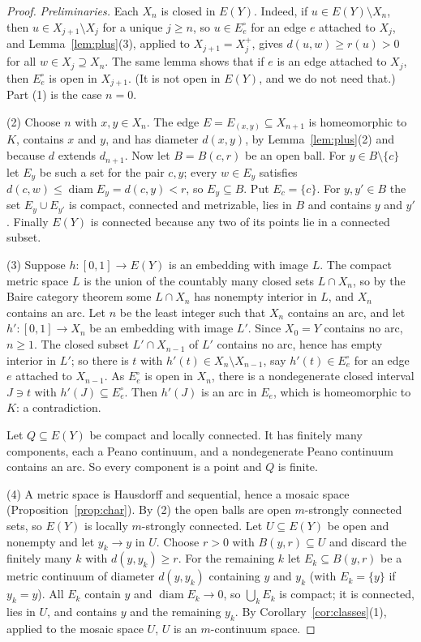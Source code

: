 \documentclass[11pt]{amsart}
\theoremstyle{definition}
\theoremstyle{remark}
\newcommand{\diam}{\operatorname{diam}}
\numberwithin{equation}{section}
\begin{document}
\begin{proof}
\emph{Preliminaries.} Each $X_n$ is closed in $E(Y)$. Indeed, if $u\in E(Y)\setminus X_n$, then $u\in X_{j+1}\setminus X_j$ for a unique $j\ge n$, so $u\in E_e^\circ$ for an edge $e$ attached to $X_j$, and Lemma~\ref{lem:plus}(3), applied to $X_{j+1}=X_j^+$, gives $d(u,w)\ge r(u)>0$ for all $w\in X_j\supseteq X_n$. The same lemma shows that if $e$ is an edge attached to $X_j$, then $E_e^\circ$ is open in $X_{j+1}$. (It is not open in $E(Y)$, and we do not need that.) Part (1) is the case $n=0$.

(2) Choose $n$ with $x,y\in X_n$. The edge $E=E_{(x,y)}\subseteq X_{n+1}$ is homeomorphic to $K$, contains $x$ and $y$, and has diameter $d(x,y)$, by Lemma~\ref{lem:plus}(2) and because $d$ extends $d_{n+1}$. Now let $B=B(c,r)$ be an open ball. For $y\in B\setminus\{c\}$ let $E_y$ be such a set for the pair $c,y$; every $w\in E_y$ satisfies $d(c,w)\le\diam E_y=d(c,y)<r$, so $E_y\subseteq B$. Put $E_c=\{c\}$. For $y,y'\in B$ the set $E_y\cup E_{y'}$ is compact, connected and metrizable, lies in $B$ and contains $y$ and $y'$. Finally $E(Y)$ is connected because any two of its points lie in a connected subset.

(3) Suppose $h\colon[0,1]\to E(Y)$ is an embedding with image $L$. The compact metric space $L$ is the union of the countably many closed sets $L\cap X_n$, so by the Baire category theorem some $L\cap X_n$ has nonempty interior in $L$, and $X_n$ contains an arc. Let $n$ be the least integer such that $X_n$ contains an arc, and let $h'\colon[0,1]\to X_n$ be an embedding with image $L'$. Since $X_0=Y$ contains no arc, $n\ge1$. The closed subset $L'\cap X_{n-1}$ of $L'$ contains no arc, hence has empty interior in $L'$; so there is $t$ with $h'(t)\in X_n\setminus X_{n-1}$, say $h'(t)\in E_e^\circ$ for an edge $e$ attached to $X_{n-1}$. As $E_e^\circ$ is open in $X_n$, there is a nondegenerate closed interval $J\ni t$ with $h'(J)\subseteq E_e^\circ$. Then $h'(J)$ is an arc in $E_e$, which is homeomorphic to $K$: a contradiction.

Let $Q\subseteq E(Y)$ be compact and locally connected. It has finitely many components, each a Peano continuum, and a nondegenerate Peano continuum contains an arc. So every component is a point and $Q$ is finite.

(4) A metric space is Hausdorff and sequential, hence a mosaic space (Proposition~\ref{prop:char}). By (2) the open balls are open $m$-strongly connected sets, so $E(Y)$ is locally $m$-strongly connected. Let $U\subseteq E(Y)$ be open and nonempty and let $y_k\to y$ in $U$. Choose $r>0$ with $B(y,r)\subseteq U$ and discard the finitely many $k$ with $d(y,y_k)\ge r$. For the remaining $k$ let $E_k\subseteq B(y,r)$ be a metric continuum of diameter $d(y,y_k)$ containing $y$ and $y_k$ (with $E_k=\{y\}$ if $y_k=y$). All $E_k$ contain $y$ and $\diam E_k\to0$, so $\bigcup_kE_k$ is compact; it is connected, lies in $U$, and contains $y$ and the remaining $y_k$. By Corollary~\ref{cor:classes}(1), applied to the mosaic space $U$, $U$ is an $m$-continuum space.


\end{proof}
\end{document}
